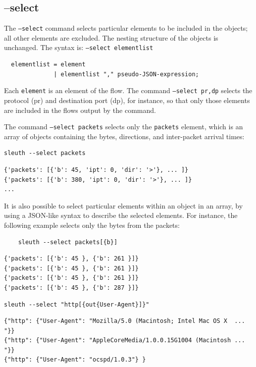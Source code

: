 \documentclass{book}
\begin{document}
\subsection{--select}
\label{selectopt}
The \texttt{--select} command selects particular elements to be included in
the objects; all other elements are excluded.  The nesting structure of the
objects is unchanged.  The syntax is:
\texttt{--select elementlist}
\begin{verbatim}
  elementlist = element
              | elementlist "," pseudo-JSON-expression;
\end{verbatim}
Each \texttt{element} is an element of the flow.  The command \texttt{--select
  pr,dp} selects the protocol (pr) and destination port (dp), for
instance, so that only those elements are included in the flows output
by the command.

The command \texttt{--select packets} selects only the \texttt{packets} element, which is an array
of objects containing the bytes, directions, and inter-packet arrival times:
\begin{mdframed}[style=cli]
\begin{verbatim}
sleuth --select packets
\end{verbatim}
\begin{verbatim}
{'packets': [{'b': 45, 'ipt': 0, 'dir': '>'}, ... ]}
{'packets': [{'b': 380, 'ipt': 0, 'dir': '>'}, ... ]}
...
\end{verbatim}
\end{mdframed}
It is also possible to select particular elements within an object in
an array, by using a JSON-like syntax to describe the selected
elements.  For instance, the following example selects only the bytes from the 
packets:
\begin{mdframed}[style=cli]
  \begin{verbatim}
    sleuth --select packets[{b}]
  \end{verbatim}
\begin{verbatim}
{'packets': [{'b': 45 }, {'b': 261 }]}
{'packets': [{'b': 45 }, {'b': 261 }]}
{'packets': [{'b': 45 }, {'b': 261 }]}
{'packets': [{'b': 45 }, {'b': 287 }]}
\end{verbatim}
\end{mdframed}

\begin{mdframed}[style=cli]
\begin{verbatim}
sleuth --select "http[{out{User-Agent}]}"
\end{verbatim}
\begin{verbatim}
{"http": {"User-Agent": "Mozilla/5.0 (Macintosh; Intel Mac OS X  ... "}}
{"http": {"User-Agent": "AppleCoreMedia/1.0.0.15G1004 (Macintosh ... "}}
{"http": {"User-Agent": "ocspd/1.0.3"} }
\end{verbatim}
\end{mdframed}
\end{document}
